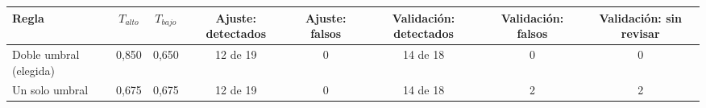 \begin{tabular}{|l|c|c|c|c|c|c|c|}
\hline
\textbf{Regla} & \textbf{$T_{alto}$} & \textbf{$T_{bajo}$} & \textbf{Ajuste: detectados} & \textbf{Ajuste: falsos} & \textbf{Validación: detectados} & \textbf{Validación: falsos} & \textbf{Validación: sin revisar} \\ \hline
Doble umbral (elegida) & 0{,}850 & 0{,}650 & 12 de 19 & 0 & 14 de 18 & 0 & 0 \\ \hline
Un solo umbral & 0{,}675 & 0{,}675 & 12 de 19 & 0 & 14 de 18 & 2 & 2 \\ \hline
\end{tabular}
